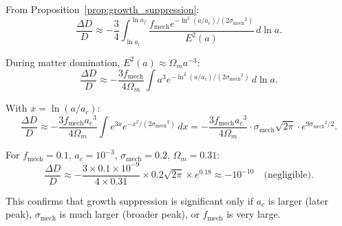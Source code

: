 \documentclass[11pt,a4paper]{article}
\newcommand{\fmech}{\ensuremath{f_{\mathrm{mech}}}}
\newcommand{\ac}{\ensuremath{a_c}}
\newcommand{\sigmamech}{\ensuremath{\sigma_{\mathrm{mech}}}}
\newcommand{\Omm}{\ensuremath{\Omega_m}}
\theoremstyle{definition}
\theoremstyle{remark}
\begin{document}
From Proposition~\ref{prop:growth_suppression}:
\begin{equation}
\frac{\Delta D}{D} \approx -\frac{3}{4}\int_{\ln a_i}^{\ln a_f} \frac{\fmech e^{-\ln^2(a/\ac)/(2\sigmamech^2)}}{E^2(a)} \, d\ln a.
\end{equation}

During matter domination, $E^2(a) \approx \Omm a^{-3}$:
\begin{equation}
\frac{\Delta D}{D} \approx -\frac{3\fmech}{4\Omm} \int a^3 e^{-\ln^2(a/\ac)/(2\sigmamech^2)} \, d\ln a.
\end{equation}

With $x = \ln(a/\ac)$:
\begin{equation}
\frac{\Delta D}{D} \approx -\frac{3\fmech \ac^3}{4\Omm} \int e^{3x} e^{-x^2/(2\sigmamech^2)} \, dx = -\frac{3\fmech \ac^3}{4\Omm} \cdot \sigmamech\sqrt{2\pi} \cdot e^{9\sigmamech^2/2}.
\end{equation}

For $\fmech = 0.1$, $\ac = 10^{-3}$, $\sigmamech = 0.2$, $\Omm = 0.31$:
\begin{equation}
\frac{\Delta D}{D} \approx -\frac{3 \times 0.1 \times 10^{-9}}{4 \times 0.31} \times 0.2\sqrt{2\pi} \times e^{0.18} \approx -10^{-10} \quad \text{(negligible)}.
\end{equation}

This confirms that growth suppression is significant only if $\ac$ is larger (later peak), $\sigmamech$ is much larger (broader peak), or $\fmech$ is very large.
\end{document}
